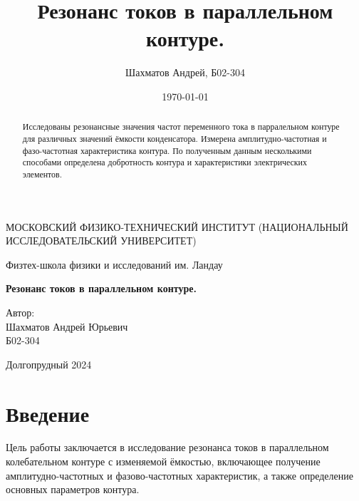 \documentclass[12pt]{article}
\title{Резонанс токов в параллельном контуре.}
\author{Шахматов Андрей, Б02-304}
\date{\today}
\begin{document}
\begin{titlepage}
    \begin{center}
        {\large МОСКОВСКИЙ ФИЗИКО-ТЕХНИЧЕСКИЙ ИНСТИТУТ (НАЦИОНАЛЬНЫЙ ИССЛЕДОВАТЕЛЬСКИЙ УНИВЕРСИТЕТ)}
    \end{center}
    \begin{center}
        {\large Физтех-школа физики и исследований им. Ландау}
    \end{center}


    \vspace{3cm}
    {\huge
        \begin{center}
            \textbf{Резонанс токов в параллельном контуре.}
        \end{center}
    }
    \vspace{2cm}
    \begin{flushright}
        {\LARGE Автор:\\ Шахматов Андрей Юрьевич \\
            \vspace{0.2cm}
            Б02-304}
    \end{flushright}
    \vspace{7 cm}
    \begin{center}
        Долгопрудный 2024
    \end{center}
    \thispagestyle{empty}
\end{titlepage}


\begin{abstract}
    Исследованы резонансные значения частот переменного тока в парралельном контуре для различных
    значений ёмкости конденсатора. Измерена амплитудно-частотная и фазо-частотная характеристика контура.
    По полученным данным несколькими способами определена добротность контура и характеристики электрических элементов.
\end{abstract}


\section{Введение}
Цель работы заключается в исследование резонанса токов в параллельном колебательном контуре с изменяемой ёмкостью, включающее получение амплитудно-частотных и фазово-частотных характеристик,
а также определение основных параметров контура.
\end{document}
